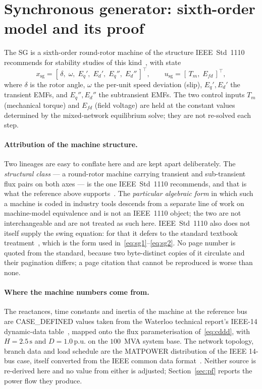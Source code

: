 \documentclass[12pt,a4paper]{article}
\theoremstyle{remark}
\newcommand{\pu}{\,\mathrm{p.u.}}
\newcommand{\second}{\,\mathrm{s}}
\begin{document}
\section{Synchronous generator: sixth-order model and its proof}\label{sec:sg}
The SG is a sixth-order round-rotor machine of the structure IEEE~Std~1110
recommends for stability studies of this kind~\cite{ieee1110}, with state
\begin{equation}
  x_{\mathrm{sg}}=[\,\delta,\;\omega,\;E_q',\;E_d',\;E_q'',\;E_d''\,]^{\top},
  \qquad u_{\mathrm{sg}}=[\,T_m,\;E_{fd}\,]^{\top},
  \label{eq:sgstate}
\end{equation}
where $\delta$ is the rotor angle, $\omega$ the per-unit speed deviation (slip),
$E_q',E_d'$ the transient EMFs, and $E_q'',E_d''$ the subtransient EMFs. The two
control inputs $T_m$ (mechanical torque) and $E_{fd}$ (field voltage) are held at
the constant values determined by the mixed-network equilibrium solve; they are
not re-solved each step.

\paragraph{Attribution of the machine structure.}
Two lineages are easy to conflate here and are kept apart deliberately. The
\emph{structural class} --- a round-rotor machine carrying transient and
sub-transient flux pairs on both axes --- is the one IEEE~Std~1110 recommends, and
that is what the reference above supports~\cite{ieee1110}. The \emph{particular
algebraic form} in which such a machine is coded in industry tools descends from a
separate line of work on machine-model equivalence and is not an IEEE~1110 object;
the two are not interchangeable and are not treated as such here. IEEE~Std~1110
also does not itself supply the swing equation: for that it defers to the standard
textbook treatment~\cite{kundur1994}, which is the form
used in~\eqref{eq:sg1}--\eqref{eq:sg2}. No page number is quoted from the
standard, because two byte-distinct copies of it circulate and their pagination
differs; a page citation that cannot be reproduced is worse than none.

\paragraph{Where the machine numbers come from.}
The reactances, time constants and inertia of the machine at the reference bus are
\textsf{CASE\_DEFINED} values taken from the Waterloo technical report's IEEE-14
dynamic-data table~\cite{kodsi2003}, mapped onto the flux parameterisation
of~\eqref{eq:cddd}, with $H=2.5\second$ and $D=1.0\pu$ on the $100$~MVA system
base. The network topology, branch data and load schedule are the MATPOWER
distribution of the IEEE 14-bus case, itself converted from the IEEE common data
format~\cite{matpower}. Neither source is re-derived here and no value from either
is adjusted; Section~\ref{sec:pf} reports the power flow they produce.
\end{document}
